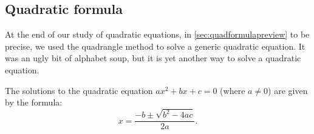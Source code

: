 \subsection{Quadratic formula}

At the end of our study of quadratic equations, in \cref{sec:quadformulapreview} to be precise, we used the quadrangle method to solve a generic quadratic equation. It was an ugly bit of alphabet soup, but it is yet another way to solve a quadratic equation.

\begin{boxdef}
The solutions to the quadratic equation $ax^2 + bx + c=0$ (where $a\neq0$) are given by the formula:
\[x=\frac{-b\pm\sqrt{b^2-4ac}}{2a}.\]
\end{boxdef}


%
%
%
%
%
%
%
%
%
%
%
%
%
%
%
%
%
%
%

